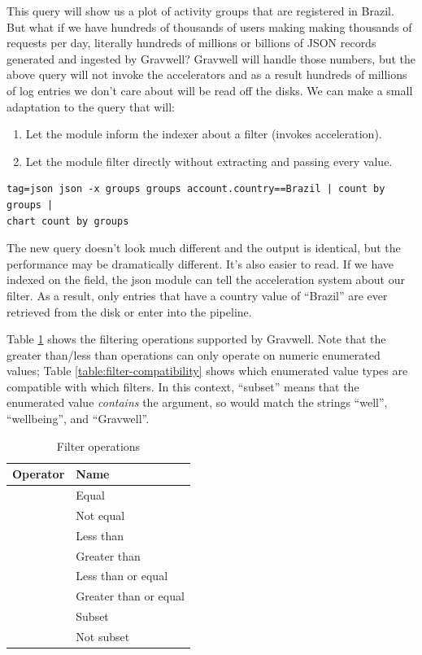 This query will show us a plot of activity groups that are registered
in Brazil. But what if we
have hundreds of thousands of users making making thousands of requests
per day, literally hundreds of millions or billions of JSON records
generated and ingested by Gravwell? Gravwell will handle those numbers,
but the above query will not invoke the accelerators and as a result
hundreds of millions of log entries we don't care about will be read off the disks.
We can make a small adaptation to the query that will:

\begin{enumerate}
\item
  Let the  module inform the indexer about a filter (invokes
  acceleration).
\item
  Let the  module filter directly without extracting and
  passing every value.
\end{enumerate}

\begin{Verbatim}[breaklines=true]
tag=json json -x groups groups account.country==Brazil | count by groups |
chart count by groups
\end{Verbatim}

The new query doesn't look much different and the output is identical,
but the performance may be dramatically different. It's also easier to read. If we have indexed
on the  field, the json module can tell the acceleration system
about our filter. As a result, only entries that have a country value of
``Brazil'' are ever retrieved from the disk or enter into the
pipeline.

Table \ref{table:filter-ops} shows the filtering operations supported by Gravwell. Note that the greater than/less than operations can only operate on numeric enumerated values; Table \ref{table:filter-compatibility} shows which enumerated value types are compatible with which filters. In this context, ``subset'' means that the enumerated value \emph{contains} the argument, so  would match the strings ``well'', ``wellbeing'', and ``Gravwell''.

\begin{table}[H]
\begin{tabular}{ll}
\textbf{Operator} & \textbf{Name} \\
\hline
\code{==} &	Equal \\
\code{!=} &	Not equal  \\
\code{<} &	Less than  \\
\code{>} &	Greater than \\
\code{<=} &	Less than or equal \\
\code{>=} &	Greater than or equal \\
\code{\textasciitilde} &	Subset \\
\code{!\textasciitilde} &	Not subset \\
\end{tabular}
\caption{Filter operations}
\label{table:filter-ops}
\end{table}

